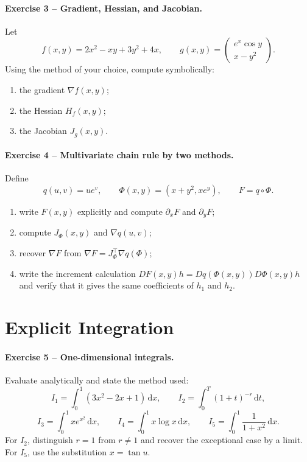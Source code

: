 \documentclass[10pt]{article}
\newcommand{\dd}{\,\mathrm{d}}
\begin{document}
\paragraph{Exercise 3 -- Gradient, Hessian, and Jacobian.}
Let
\[
f(x,y)=2x^2-xy+3y^2+4x,
\qquad
g(x,y)=\begin{pmatrix}e^x\cos y\\x-y^2\end{pmatrix}.
\]
Using the method of your choice, compute symbolically:
\begin{enumerate}
\item the gradient $\nabla f(x,y)$;
\item the Hessian $H_f(x,y)$;
\item the Jacobian $J_g(x,y)$.
\end{enumerate}

\paragraph{Exercise 4 -- Multivariate chain rule by two methods.}
Define
\[
q(u,v)=ue^v,
\qquad
\Phi(x,y)=(x+y^2,xe^y),
\qquad F=q\circ\Phi.
\]
\begin{enumerate}
\item write $F(x,y)$ explicitly and compute $\partial_xF$ and $\partial_yF$;
\item compute $J_\Phi(x,y)$ and $\nabla q(u,v)$;
\item recover $\nabla F$ from
$\nabla F=J_\Phi^\top\nabla q(\Phi)$;
\item write the increment calculation
$DF(x,y)h=Dq(\Phi(x,y))D\Phi(x,y)h$ and verify that it gives the same
coefficients of $h_1$ and $h_2$.
\end{enumerate}

\section{Explicit Integration}

\paragraph{Exercise 5 -- One-dimensional integrals.}
Evaluate analytically and state the method used:
\[
I_1=\int_0^1(3x^2-2x+1)\dd x,
\qquad
I_2=\int_0^T(1+t)^{-r}\dd t,
\]
\[
I_3=\int_0^1xe^{x^2}\dd x,
\qquad
I_4=\int_0^1x\log x\dd x,
\qquad
I_5=\int_0^1\frac{1}{1+x^2}\dd x.
\]
For $I_2$, distinguish $r=1$ from $r\neq1$ and recover the exceptional case
by a limit. For $I_5$, use the substitution $x=\tan u$.
\end{document}
